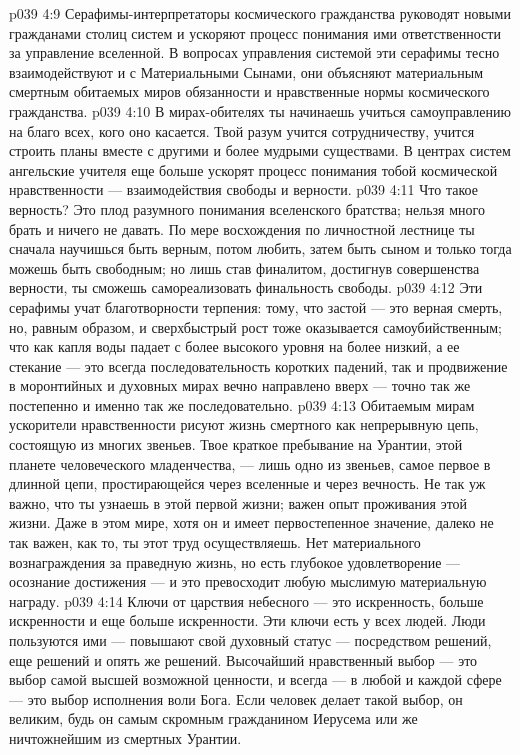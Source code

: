 \vs p039 4:9 Серафимы\hyp{}интерпретаторы космического гражданства руководят новыми гражданами столиц систем и ускоряют процесс понимания ими ответственности за управление вселенной. В вопросах управления системой эти серафимы тесно взаимодействуют и с Материальными Сынами, они объясняют материальным смертным обитаемых миров обязанности и нравственные нормы космического гражданства.
\vs p039 4:10 \pc {}\bibnobreakspace {} В мирах\hyp{}обителях ты начинаешь учиться самоуправлению на благо всех, кого оно касается. Твой разум учится сотрудничеству, учится строить планы вместе с другими и более мудрыми существами. В центрах систем ангельские учителя еще больше ускорят процесс понимания тобой космической нравственности --- взаимодействия свободы и верности.
\vs p039 4:11 Что такое верность? Это плод разумного понимания вселенского братства; нельзя много брать и ничего не давать. По мере восхождения по личностной лестнице ты сначала научишься быть верным, потом любить, затем быть сыном и только тогда можешь быть свободным; но лишь став финалитом, достигнув совершенства верности, ты сможешь самореализовать финальность свободы.
\vs p039 4:12 \pc Эти серафимы учат благотворности терпения: тому, что застой --- это верная смерть, но, равным образом, и сверхбыстрый рост тоже оказывается самоубийственным; что как капля воды падает с более высокого уровня на более низкий, а ее стекание --- это всегда последовательность коротких падений, так и продвижение в моронтийных и духовных мирах вечно направлено вверх --- точно так же постепенно и именно так же последовательно.
\vs p039 4:13 Обитаемым мирам ускорители нравственности рисуют жизнь смертного как непрерывную цепь, состоящую из многих звеньев. Твое краткое пребывание на Урантии, этой планете человеческого младенчества, --- лишь одно из звеньев, самое первое в длинной цепи, простирающейся через вселенные и через вечность. Не так уж важно, что ты узнаешь в этой первой жизни; важен опыт проживания этой жизни. Даже  в этом мире, хотя он и имеет первостепенное значение, далеко не так важен, как то,  ты этот труд осуществляешь. Нет материального вознаграждения за праведную жизнь, но есть глубокое удовлетворение --- осознание достижения --- и это превосходит любую мыслимую материальную награду.
\vs p039 4:14 Ключи от царствия небесного --- это искренность, больше искренности и еще больше искренности. Эти ключи есть у всех людей. Люди пользуются ими --- повышают свой духовный статус --- посредством решений, еще решений и опять же решений. Высочайший нравственный выбор --- это выбор самой высшей возможной ценности, и всегда --- в любой и каждой сфере --- это выбор исполнения воли Бога. Если человек делает такой выбор, он  великим, будь он самым скромным гражданином Иерусема или же ничтожнейшим из смертных Урантии.
